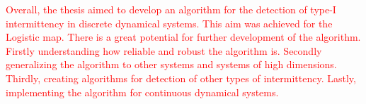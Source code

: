 \textcolor{red}{
Overall, the thesis aimed to develop an algorithm for the detection of type-I intermittency in discrete dynamical systems.
This aim was achieved for the Logistic map.
There is a great potential for further development of the algorithm.
Firstly understanding how reliable and robust the algorithm is.
Secondly generalizing the algorithm to other systems and systems of high dimensions.
Thirdly, creating algorithms for detection of other types of intermittency.
Lastly, implementing the algorithm for continuous dynamical systems.
}

\endinput